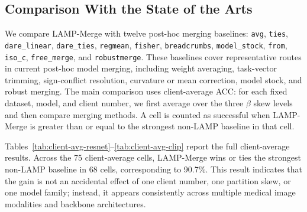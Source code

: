\documentclass[letterpaper]{article} %
\begin{document}
\subsection{Comparison With the State of the Arts}
We compare LAMP-Merge with twelve post-hoc merging baselines: \texttt{avg}, \texttt{ties}, \texttt{dare\_linear}, \texttt{dare\_ties}, \texttt{regmean}, \texttt{fisher}, \texttt{breadcrumbs}, \texttt{model\_stock}, \texttt{from}, \texttt{iso\_c}, \texttt{free\_merge}, and \texttt{robustmerge}. These baselines cover representative routes in current post-hoc model merging, including weight averaging, task-vector trimming, sign-conflict resolution, curvature or mean correction, model stock, and robust merging. The main comparison uses client-average ACC: for each fixed dataset, model, and client number, we first average over the three $\beta$ skew levels and then compare merging methods. A cell is counted as successful when LAMP-Merge is greater than or equal to the strongest non-LAMP baseline in that cell.

Tables~\ref{tab:client-avg-resnet}--\ref{tab:client-avg-clip} report the full client-average results. Across the 75 client-average cells, LAMP-Merge wins or ties the strongest non-LAMP baseline in 68 cells, corresponding to 90.7\%. This result indicates that the gain is not an accidental effect of one client number, one partition skew, or one model family; instead, it appears consistently across multiple medical image modalities and backbone architectures.
\end{document}
